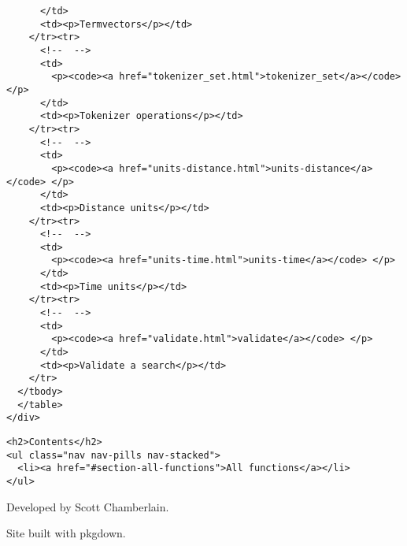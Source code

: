 \documentclass[]{article}
\begin{document}
\begin{verbatim}
      </td>
      <td><p>Termvectors</p></td>
    </tr><tr>
      <!--  -->
      <td>
        <p><code><a href="tokenizer_set.html">tokenizer_set</a></code> </p>
      </td>
      <td><p>Tokenizer operations</p></td>
    </tr><tr>
      <!--  -->
      <td>
        <p><code><a href="units-distance.html">units-distance</a></code> </p>
      </td>
      <td><p>Distance units</p></td>
    </tr><tr>
      <!--  -->
      <td>
        <p><code><a href="units-time.html">units-time</a></code> </p>
      </td>
      <td><p>Time units</p></td>
    </tr><tr>
      <!--  -->
      <td>
        <p><code><a href="validate.html">validate</a></code> </p>
      </td>
      <td><p>Validate a search</p></td>
    </tr>
  </tbody>
  </table>
</div>
\end{verbatim}

\hypertarget{sidebar}{}
\begin{verbatim}
<h2>Contents</h2>
<ul class="nav nav-pills nav-stacked">
  <li><a href="#section-all-functions">All functions</a></li>
</ul>
\end{verbatim}

Developed by Scott Chamberlain.

Site built with pkgdown.
\end{document}
